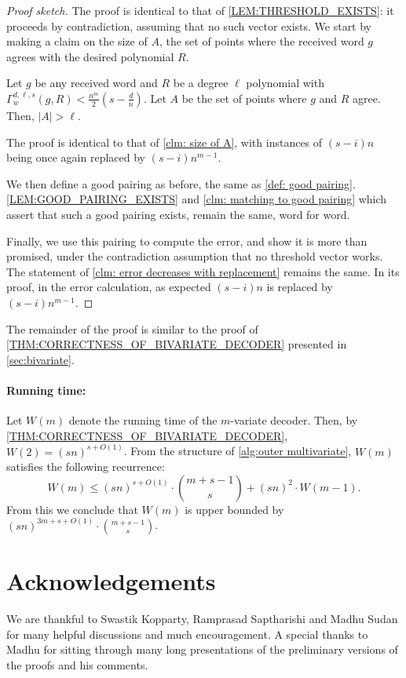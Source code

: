 \documentclass{theoretics}
\def\abs#1{\left| #1 \right|}
\begin{document}
	\begin{proof}[Proof sketch]
		The proof is identical to that of \cref{LEM:THRESHOLD_EXISTS}:
		it  proceeds by contradiction, assuming that no such vector exists. We start by making a claim on the size of $A$, the set of points where the received word $g$ agrees with the desired polynomial $R$. 
		
		\begin{claim} 
			Let $g$ be any received word and $R$ be a degree $\ell$ polynomial with $\Gamma_w^{d, \ell, s} (g, R) < \frac{n^m}{2}(s-\frac{d}{n})$. Let $A$ be the set of points where $g$ and $R$ agree. Then, $\abs{A} > \ell$. 
		\end{claim}
		
		\begin{subproof}
			The proof is identical to that of \autoref{clm: size of A}, with instances of $(s-i)n$ being once again replaced by $(s-i)n^{m-1}$. 
		\end{subproof}
		
		We then define a good pairing as before, the same as \cref{def: good pairing}. \cref{LEM:GOOD_PAIRING_EXISTS} and \autoref{clm: matching to good pairing} which assert that such a good pairing exists, remain the same, word for word.
		
		Finally, we use this pairing to compute the error, and show it is more than promised, under the contradiction assumption that no threshold vector works. The statement of \autoref{clm: error decreases with replacement} remains the same. In its proof, in the error calculation, as expected $(s-i)n$ is replaced by $(s-i)n^{m-1}$. 
	\end{proof}
	
	The remainder of the proof is similar to the proof of \cref{THM:CORRECTNESS_OF_BIVARIATE_DECODER} presented in \cref{sec:bivariate}.
	
	\paragraph{Running time:} Let $W(m)$ denote the running time of the $m$-variate decoder. Then, by \cref{THM:CORRECTNESS_OF_BIVARIATE_DECODER}, $W(2)=(sn)^{s+O(1)}$. From the structure of \cref{alg:outer multivariate}, $W(m)$ satisfies the following recurrence:
	\[
	W(m)\leq (sn)^{s+O(1)}\cdot \binom{m+s-1}{s} + (sn)^{2}\cdot W(m-1).
	\]
	From this we conclude that $W(m)$ is upper bounded by $(sn)^{3m+s+O(1)}\cdot \binom{m+s-1}{s}$.
	
	\section*{Acknowledgements}
	We are thankful to Swastik Kopparty,  Ramprasad Saptharishi and Madhu Sudan for many helpful discussions and much encouragement. 
	A special thanks to Madhu for sitting through many long presentations of the preliminary versions of the proofs and his comments.  

    \newpage
	\printbibliography
\end{document}
